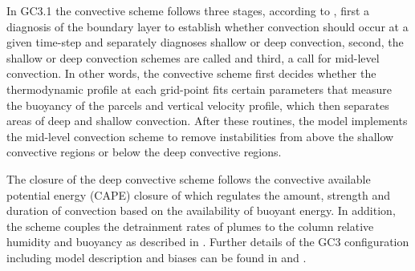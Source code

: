 In GC3.1 the convective scheme follows three stages, according to \cite{walters2019}, first a diagnosis of the boundary layer to establish whether convection should occur at a given time-step and separately diagnoses shallow or deep convection, second, the shallow or deep convection schemes are called and third, a call for mid-level convection. 
In other words, the convective scheme first decides whether the thermodynamic profile at each grid-point fits certain parameters that measure the buoyancy of the parcels and vertical velocity profile, which then separates areas of deep and shallow convection. After these routines, the model implements the mid-level convection scheme to remove instabilities from above the shallow convective regions or below the deep convective regions. 

The closure of the deep convective scheme follows the convective available potential energy (CAPE) closure of \cite{fritsch} which regulates the amount, strength and duration of convection based on the availability of buoyant energy. In addition, the scheme couples the detrainment rates of plumes to the column relative humidity and buoyancy as described in \cite{derbyshire2011}.
Further details of the GC3 configuration including model description and biases can be found in \cite{williams2018} and \cite{kuhlbrodt2018}.


